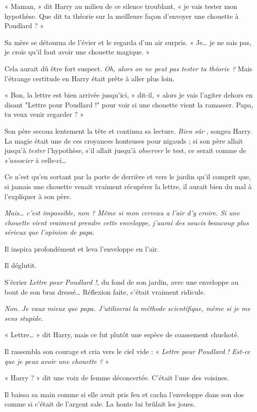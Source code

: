 « Maman, » dit Harry au milieu de ce silence troublant, « je vais tester mon hypothèse. Que dit ta théorie sur la meilleure façon d'envoyer une chouette à Poudlard ? »

Sa mère se détourna de l'évier et le regarda d'un air surpris. « Je… je ne sais pas, je crois qu'il faut avoir une chouette magique. »

Cela aurait dû être fort suspect. \emph{Oh, alors on ne peut pas tester ta théorie ?}  Mais l'étrange certitude en Harry était prête à aller plus loin.

« Bon, la lettre est bien arrivée jusqu'ici, » dit-il, « alors je vais l'agiter dehors en disant "Lettre pour Poudlard !" pour voir si une chouette vient la ramasser. Papa, tu veux venir regarder ? »

Son père secoua lentement la tête et continua sa lecture. \emph{Bien sûr} , songea Harry. La magie était une de ces croyances honteuses pour nigauds ; si son père allait jusqu'à \emph{tester } l'hypothèse, s'il allait jusqu'à \emph{observer}  le test, ce serait comme de \emph{s'associer}  à celle-ci…

Ce n'est qu'en sortant par la porte de derrière et vers le jardin qu'il comprit que, si jamais une chouette venait vraiment récupérer la lettre, il aurait bien du mal à l'expliquer à son père.

\emph{Mais… c'est impossible, non ? Même si mon cerveau a l'air d'y croire. Si une chouette vient vraiment prendre cette enveloppe, j'aurai des soucis beaucoup plus sérieux que l'opinion de papa.} 

Il inspira profondément et leva l'enveloppe en l'air.

Il déglutit.

S'écrier \emph{Lettre pour Poudlard !,}  du fond de son jardin, avec une enveloppe au bout de son bras dressé… Réflexion faite, c'était vraiment ridicule.

\emph{Non. Je vaux mieux que papa. J'utiliserai la méthode scientifique, même si je me sens stupide.} 

« Lettre… » dit Harry, mais ce fut plutôt une espèce de coassement chuchoté.

Il rassembla son courage et cria vers le ciel vide : « \emph{Lettre pour Poudlard ! Est-ce que je peux avoir une chouette ?}  »

« Harry ? » dit une voix de femme déconcertée. C'était l'une des voisines.

Il baissa sa main comme si elle avait pris feu et cacha l'enveloppe dans son dos comme si c'était de l'argent sale. La honte lui brûlait les joues.

